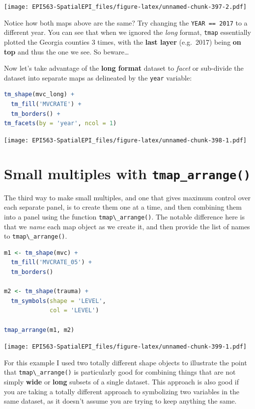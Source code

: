 \documentclass[
]{book}
\newcommand{\passthrough}[1]{#1}
\begin{document}
\texttt{[image: EPI563-SpatialEPI\_files/figure-latex/unnamed-chunk-397-2.pdf]}

Notice how both maps above are the same? Try changing the \passthrough{\lstinline!YEAR == 2017!} to a different year. You can see that when we ignored the \emph{long} format, \passthrough{\lstinline!tmap!} essentially plotted the Georgia counties 3 times, with the \textbf{last layer} (e.g.~2017) being \textbf{on top} and thus the one we see. So beware\ldots{}

Now let's take advantage of the \textbf{long format} dataset to \emph{facet} or sub-divide the dataset into separate maps as delineated by the \passthrough{\lstinline!year!} variable:

\begin{lstlisting}[language=R]
tm_shape(mvc_long) +
  tm_fill('MVCRATE') + 
  tm_borders() +
tm_facets(by = 'year', ncol = 1)
\end{lstlisting}

\texttt{[image: EPI563-SpatialEPI\_files/figure-latex/unnamed-chunk-398-1.pdf]}

\hypertarget{small-multiples-with-tmap_arrange}{%
\section{\texorpdfstring{Small multiples with \texttt{tmap\_arrange()}}{Small multiples with tmap\_arrange()}}\label{small-multiples-with-tmap_arrange}}

The third way to make small multiples, and one that gives maximum control over each separate panel, is to create them one at a time, and then combining them into a panel using the function \passthrough{\lstinline!tmap\_arrange()!}. The notable difference here is that we \emph{name} each map object as we create it, and then provide the list of names to \passthrough{\lstinline!tmap\_arrange()!}.

\begin{lstlisting}[language=R]
m1 <- tm_shape(mvc) +
  tm_fill('MVCRATE_05') +
  tm_borders()

m2 <- tm_shape(trauma) +
  tm_symbols(shape = 'LEVEL',
             col = 'LEVEL')

tmap_arrange(m1, m2)
\end{lstlisting}

\texttt{[image: EPI563-SpatialEPI\_files/figure-latex/unnamed-chunk-399-1.pdf]}

For this example I used two totally different shape objects to illustrate the point that \passthrough{\lstinline!tmap\_arrange()!} is particularly good for combining things that are not simply \textbf{wide} or \textbf{long} subsets of a single dataset. This approach is also good if you are taking a totally different approach to symbolizing two variables in the same dataset, as it doesn't assume you are trying to keep anything the same.
\end{document}
